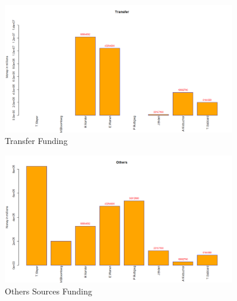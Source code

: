 \begin{figure}[H]
    \centering
    \includegraphics[width=0.9\textwidth]{figures/Transfer.png}
    \caption{Transfer Funding}
    \label{Transfer}
\end{figure}

\begin{figure}[H]
    \centering
    \includegraphics[width=0.9\textwidth]{figures/Others.png}
    \caption{Others Sources Funding}
    \label{Others}
\end{figure}
